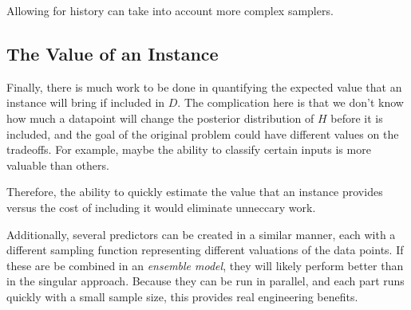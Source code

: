 \documentclass[twoside]{article}
\begin{document}
Allowing for history can take into account more complex samplers.

\subsection{The Value of an Instance}

Finally, there is much work to be done in quantifying the expected value that an instance will bring if included in \(D\). The complication here is that we don't know how much a datapoint will change the posterior distribution of \(H\) before it is included, and the goal of the original problem could have different values on the tradeoffs. For example, maybe the ability to classify certain inputs is more valuable than others.

Therefore, the ability to quickly estimate the value that an instance provides versus the cost of including it would eliminate unneccary work.

Additionally, several predictors can be created in a similar manner, each with a different sampling function representing different valuations of the data points. If these are be combined in an \textit{ensemble model}, they will likely perform better than in the singular approach. Because they can be run in parallel, and each part runs quickly with a small sample size, this provides real engineering benefits.
\end{document}
